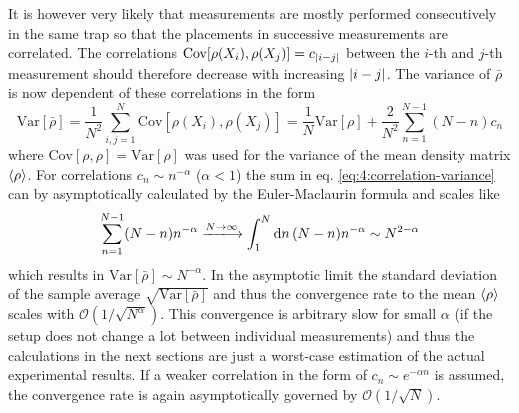 It is however very likely that measurements are mostly performed consecutively in the same trap so that the placements in successive measurements are correlated.
The correlations $\mathrm{Cov}[\rho(X_i), \rho(X_j)] = c_{\left\lvert i-j\right\rvert}$ between the $i$-th and $j$-th measurement should therefore decrease with increasing $\left\lvert i-j\right\rvert$.
The variance of $\bar{\rho}$ is now dependent of these correlations in the form \cite[p. 1227]{Riley_2018}
\begin{equation}\label{eq:4:correlation-variance}
  \mathrm{Var}[\bar{\rho}] = \frac{1}{N^2} \sum_{i,j=1}^{N} \mathrm{Cov}[\rho(X_i), \rho(X_j)] = \frac{1}{N}\mathrm{Var}[\rho] + \frac{2}{N^2}\sum_{n=1}^{N - 1}(N - n) c_n
\end{equation}
where $\mathrm{Cov}[\rho, \rho] = \mathrm{Var}[\rho]$ was used for the variance of the mean density matrix $\left\langle\rho\right\rangle$.
For correlations $c_n \sim n^{-\alpha}$ ($\alpha < 1$) the sum in eq. \eqref{eq:4:correlation-variance} can by asymptotically calculated by the Euler-Maclaurin formula and scales like
\begin{equation}
  \sum_{n=1}^{N - 1}(N - n)n^{-\alpha} \xlongrightarrow{N\rightarrow\infty} \int_1^{N}\dd n \, (N-n)n^{-\alpha} \sim N^{2-\alpha}
\end{equation}
which results in $\mathrm{Var}[\bar{\rho}] \sim N^{-\alpha}$. In the asymptotic limit the standard deviation of the sample average $\sqrt{\mathrm{Var}[\bar{\rho}]}$ and thus the convergence rate to the mean $\left\langle\rho\right\rangle$ scales with $\mathcal{O}(1/\sqrt{N^\alpha})$.
This convergence is arbitrary slow for small $\alpha$ (if the setup does not change a lot between individual measurements) and thus the calculations in the next sections are just a worst-case estimation of the actual experimental results.
If a weaker correlation in the form of $c_n \sim e^{-\alpha n}$ is assumed, the convergence rate is again asymptotically governed by $\mathcal{O}(1/\sqrt{N})$.









